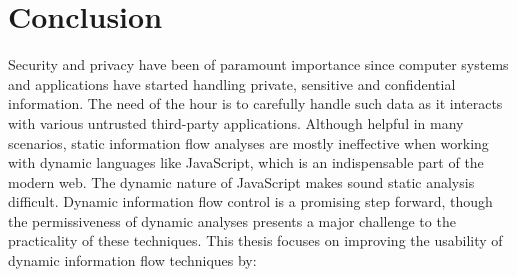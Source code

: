 \chapter{Conclusion}
\label{ch:conclusion}

Security and privacy have been of paramount importance since computer
systems and applications have started handling private, sensitive and
confidential information. The need of the hour is to carefully handle
such data as it interacts with various untrusted third-party
applications. Although helpful in many scenarios, static information
flow analyses are mostly ineffective when working with dynamic
languages like JavaScript, which is an indispensable part of the
modern web. The dynamic nature of JavaScript makes sound static
analysis difficult. Dynamic information flow control is a promising
step forward, though the permissiveness of dynamic analyses presents a
major challenge to the practicality of these techniques. This thesis
focuses on improving the usability of dynamic information flow
techniques by:  
 
